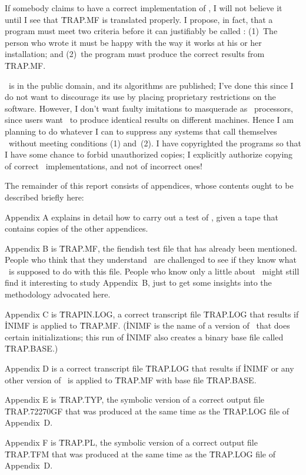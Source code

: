 If somebody claims to have a correct implementation of \MF, I will not
believe it until I see that \.{TRAP.MF} is translated properly.
I propose, in fact, that a program must meet two criteria before it
can justifiably be called \MF: (1)~The person who wrote it must be
happy with the way it works at his or her installation; and (2)~the
program must produce the correct results from \.{TRAP.MF}.

\MF\ is in the public domain, and its algorithms are published;
I've done this since I do not want to discourage its use by placing
proprietary restrictions on the software. However, I don't want
faulty imitations to masquerade as \MF\ processors, since users
want \MF\ to produce identical results on different machines.
Hence I am planning to do whatever I can to suppress any systems that
call themselves \MF\ without meeting conditions (1) and~(2).
I have copyrighted the programs so that I have some chance to forbid
unauthorized copies; I explicitly authorize copying of correct
\MF\ implementations, and not of incorrect ones!

The remainder of this report consists of appendices, whose contents ought
to be described briefly here:

Appendix A explains in detail how to carry out a test of \MF, given
a tape that contains copies of the other appendices.

Appendix B is \.{TRAP.MF}, the fiendish test file that has already
been mentioned. People who think that they understand \MF\ are challenged
to see if they know what \MF\ is supposed to do with this file.
People who know only a little about \MF\ might still find it
interesting to study Appendix~B, just to get some insights into the
methodology advocated here.

Appendix C is \.{TRAPIN.LOG}, a correct transcript file \.{TRAP.LOG}
that results if \.{INIMF} is applied to \.{TRAP.MF}. (\.{INIMF} is
the name of a version of \MF\ that does certain initializations;
this run of \.{INIMF} also creates a binary base file called \.{TRAP.BASE}.)

Appendix D is a correct transcript file \.{TRAP.LOG} that results if
\.{INIMF} or any other version of \MF\ is applied to \.{TRAP.MF}
with base file \.{TRAP.BASE}.

Appendix E is \.{TRAP.TYP}, the symbolic version of a correct output
file \.{TRAP.72270GF} that was produced at the same time as the \.{TRAP.LOG}
file of Appendix~D.

Appendix F is \.{TRAP.PL}, the symbolic version of a correct output
file \.{TRAP.TFM} that was produced at the same time as the \.{TRAP.LOG}
file of Appendix~D.

